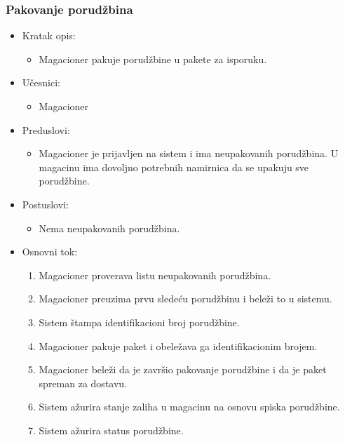 
\subsubsection{Pakovanje porudžbina}
	\begin{itemize}
		\item{Kratak opis:} 
		\begin{itemize}
			\item{Magacioner pakuje porudžbine u pakete za isporuku.}
		\end{itemize}
		
		\item{Učesnici:} 
		\begin{itemize}
			\item{Magacioner}
		\end{itemize}		

		\item{Preduslovi:}
		\begin{itemize}
			\item{Magacioner je prijavljen na sistem i ima neupakovanih porudžbina. U magacinu ima dovoljno potrebnih namirnica da se upakuju sve porudžbine.}
		\end{itemize}
		
		\item{Postuslovi:}
		\begin{itemize}
			\item{Nema neupakovanih porudžbina.}
		\end{itemize}
		
		\item{Osnovni tok:}
		\begin{enumerate}
			\item{Magacioner proverava listu neupakovanih porudžbina.}
			\item{Magacioner preuzima prvu sledeću porudžbinu i beleži to u sistemu.}
			\item{Sistem štampa identifikacioni broj porudžbine.}
			\item{Magacioner pakuje paket i obeležava ga identifikacionim brojem.}
			\item{Magacioner beleži da je završio pakovanje porudžbine i da je paket spreman za dostavu.}
			\item{Sistem ažurira stanje zaliha u magacinu na osnovu spiska porudžbine.}
			\item{Sistem ažurira status porudžbine.}



\end{enumerate}
\end{itemize}
